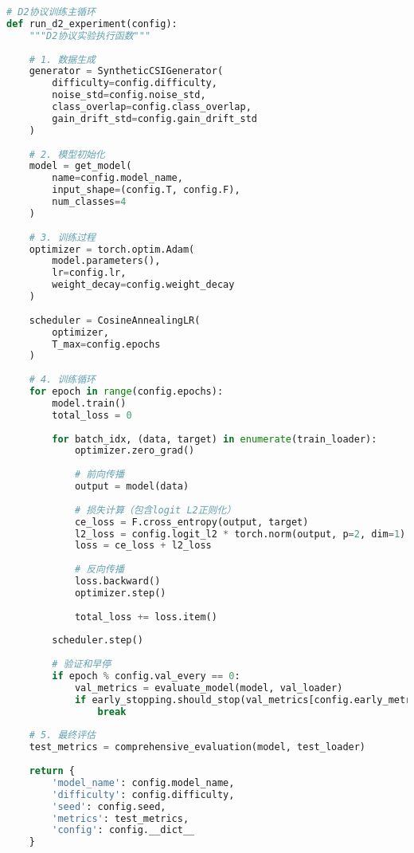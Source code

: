 \begin{lstlisting}[language=Python,caption=D2协议核心训练代码]
# D2协议训练主循环
def run_d2_experiment(config):
    """D2协议实验执行函数"""
    
    # 1. 数据生成
    generator = SyntheticCSIGenerator(
        difficulty=config.difficulty,
        noise_std=config.noise_std,
        class_overlap=config.class_overlap,
        gain_drift_std=config.gain_drift_std
    )
    
    # 2. 模型初始化
    model = get_model(
        name=config.model_name,
        input_shape=(config.T, config.F),
        num_classes=4
    )
    
    # 3. 训练过程
    optimizer = torch.optim.Adam(
        model.parameters(), 
        lr=config.lr,
        weight_decay=config.weight_decay
    )
    
    scheduler = CosineAnnealingLR(
        optimizer, 
        T_max=config.epochs
    )
    
    # 4. 训练循环
    for epoch in range(config.epochs):
        model.train()
        total_loss = 0
        
        for batch_idx, (data, target) in enumerate(train_loader):
            optimizer.zero_grad()
            
            # 前向传播
            output = model(data)
            
            # 损失计算（包含logit L2正则化）
            ce_loss = F.cross_entropy(output, target)
            l2_loss = config.logit_l2 * torch.norm(output, p=2, dim=1).mean()
            loss = ce_loss + l2_loss
            
            # 反向传播
            loss.backward()
            optimizer.step()
            
            total_loss += loss.item()
        
        scheduler.step()
        
        # 验证和早停
        if epoch % config.val_every == 0:
            val_metrics = evaluate_model(model, val_loader)
            if early_stopping.should_stop(val_metrics[config.early_metric]):
                break
    
    # 5. 最终评估
    test_metrics = comprehensive_evaluation(model, test_loader)
    
    return {
        'model_name': config.model_name,
        'difficulty': config.difficulty,
        'seed': config.seed,
        'metrics': test_metrics,
        'config': config.__dict__
    }
\end{lstlisting}

